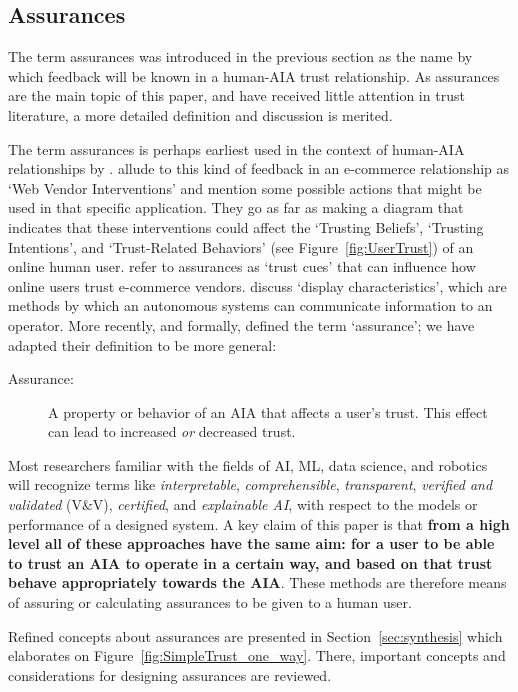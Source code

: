 \subsection{Assurances} \label{sec:assurances}
    The term assurances was introduced in the previous section as the name by which feedback will be known in a human-AIA trust relationship. As assurances are the main topic of this paper, and have received little attention in trust literature, a more detailed definition and discussion is merited.

    The term assurances is perhaps earliest used in the context of human-AIA relationships by \citet{Sheridan1984-kx}. \citet{McKnight2001-fa} allude to this kind of feedback in an e-commerce relationship as `Web Vendor Interventions' and mention some possible actions that might be used in that specific application. They go as far as making a diagram that indicates that these interventions could affect the `Trusting Beliefs', `Trusting Intentions', and `Trust-Related Behaviors' (see Figure~\ref{fig:UserTrust}) of an online human user. \citet{Corritore2003-gx} refer to assurances as `trust cues' that can influence how online users trust e-commerce vendors. \citet{Lee2004-pv} discuss `display characteristics', which are methods by which an autonomous systems can communicate information to an operator. More recently, and formally, \citet{Lillard2016-yg} defined the term `assurance'; we have adapted their definition to be more general:    
    \begin{description}
        \item [Assurance:] A property or behavior of an AIA that affects a user's trust. This effect can lead to increased \emph{or} decreased trust. 
    \end{description}

    Most researchers familiar with the fields of AI, ML, data science, and robotics will recognize terms like \emph{interpretable}, \emph{comprehensible}, \emph{transparent}, \emph{verified and validated} (V\&V), \emph{certified}, and \emph{explainable AI}, with respect to the models or performance of a designed system. A key claim of this paper is that \textbf{from a high level all of these approaches have the same aim: for a user to be able to trust an AIA to operate in a certain way, and based on that trust behave appropriately towards the AIA}. These methods are therefore means of assuring or calculating assurances to be given to a human user.

    Refined concepts about assurances are presented in Section~\ref{sec:synthesis} which elaborates on Figure~\ref{fig:SimpleTrust_one_way}. There, important concepts and considerations for designing assurances are reviewed. 

